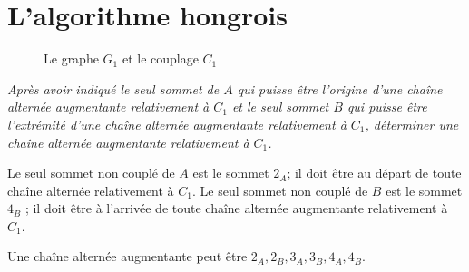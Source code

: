 \newpage
\section{L'algorithme hongrois}
\begin{figure}[h]
\centering
{}
\caption{Le graphe $G_1$ et le couplage $C_1$}
\end{figure}
\begin{Exercise}\it
Après avoir indiqué le seul sommet de $A$ qui puisse être l'origine d'une chaîne alternée augmentante relativement à $C_1$ et le seul sommet $B$ qui puisse être l'extrémité d'une chaîne alternée augmentante relativement à $C_1$, déterminer une chaîne alternée augmentante relativement à $C_1$.
\end{Exercise}
\begin{Answer}
Le seul sommet non couplé de $A$ est le sommet $2_A$; il doit être au départ de toute chaîne alternée relativement à $C_1$.
Le seul sommet non couplé de $B$ est le sommet $4_B$ ; il doit être à l'arrivée de toute chaîne alternée augmentante relativement à $C_1$.

Une chaîne alternée augmentante peut être $2_A,2_B,3_A,3_B,4_A,4_B$.
\end{Answer}
